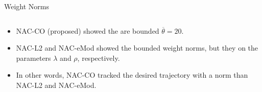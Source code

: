 \documentclass[8pt, aspectratio=169, handout]{beamer}
\newcommand{\ctxt}[2]{\color{#1}{#2}\color{black}}
\begin{document}
\begin{frame}{\insertsubsectionhead}{Weight Norms}
\begin{columns}
  \end{columns}

  \begin{itemize}
    \item<+-> NAC-CO (proposed) showed the \ctxt{airforceblue}{weight norms } are bounded \ctxt{awesome}{under pre-defined constraint } $\overline{\theta}=20$.
    \item<+-> NAC-L2 and NAC-eMod showed the bounded weight norms, but they \ctxt{awesome}{depended } on the parameters $\lambda$ and $\rho$, respectively.
    \item<+-> In other words, NAC-CO tracked the desired trajectory with a \ctxt{airforceblue}{smaller weight } norm than NAC-L2 and NAC-eMod.
  \end{itemize}

\end{frame}
\end{document}
